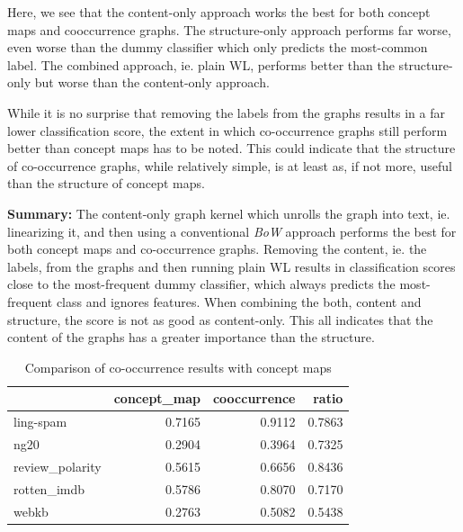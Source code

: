 Here, we see that the content-only approach works the best for both concept maps and cooccurrence graphs.
The structure-only approach performs far worse, even worse than the dummy classifier which only predicts the most-common label.
The combined approach, ie. plain WL, performs better than the structure-only but worse than the content-only approach.

While it is no surprise that removing the labels from the graphs results in a far lower classification score, the extent in which co-occurrence graphs still perform better than concept maps has to be noted.
This could indicate that the structure of co-occurrence graphs, while relatively simple, is at least as, if not more, useful than the structure of concept maps.

\textbf{Summary:}
The content-only graph kernel which unrolls the graph into text, ie. linearizing it, and then using a conventional \textit{BoW} approach performs the best for both concept maps and co-occurrence graphs.
Removing the content, ie. the labels, from the graphs and then running plain WL results in classification scores close to the most-frequent dummy classifier, which always predicts the most-frequent class and ignores features.
When combining the both, content and structure, the score is not as good as content-only.
This all indicates that the content of the graphs has a greater importance than the structure.



\begin{table}[htb!]
\centering
\begin{tabular}{lrrr}
&  concept\_map &  cooccurrence &   ratio \\
\midrule
ling-spam       &  0.7165 &  0.9112 &  0.7863 \\
ng20            &  0.2904 &  0.3964 &  0.7325 \\
review\_polarity &  0.5615 &  0.6656 &  0.8436 \\
rotten\_imdb     &  0.5786 &  0.8070 &  0.7170 \\
webkb           &  0.2763 &  0.5082 &  0.5438 \\
\bottomrule
\end{tabular}
\caption[Results: Co-Occurrence vs. Concept Maps]{Comparison of co-occurrence results with concept maps}\label{table:comparison_results_cooccurrence}
\end{table}

